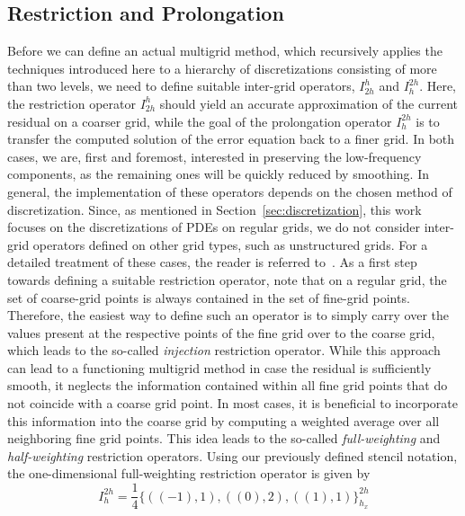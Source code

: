 \subsection{Restriction and Prolongation}
\label{subsec:restriction-and-prolongation}
Before we can define an actual multigrid method, which recursively applies the techniques introduced here to a hierarchy of discretizations consisting of more than two levels, we need to define suitable inter-grid operators, $I_{2h}^{h}$ and $I_{h}^{2h}$.
Here, the restriction operator $I_{2h}^{h}$ should yield an accurate approximation of the current residual on a coarser grid, while the goal of the prolongation operator $I_{h}^{2h}$ is to transfer the computed solution of the error equation back to a finer grid.
In both cases, we are, first and foremost, interested in preserving the low-frequency components, as the remaining ones will be quickly reduced by smoothing.
In general, the implementation of these operators depends on the chosen method of discretization. 
Since, as mentioned in Section~\ref{sec:discretization}, this work focuses on the discretizations of PDEs on regular grids, we do not consider inter-grid operators defined on other grid types, such as unstructured grids.
For a detailed treatment of these cases, the reader is referred to~\cite{trottenberg2000multigrid,ruge1987algebraic,stuben2001introduction}.
As a first step towards defining a suitable restriction operator, note that on a regular grid, the set of coarse-grid points is always contained in the set of fine-grid points.
Therefore, the easiest way to define such an operator is to simply carry over the values present at the respective points of the fine grid over to the coarse grid, which leads to the so-called \emph{injection} restriction operator.
While this approach can lead to a functioning multigrid method in case the residual is sufficiently smooth, it neglects the information contained within all fine grid points that do not coincide with a coarse grid point.
In most cases, it is beneficial to incorporate this information into the coarse grid by computing a weighted average over all neighboring fine grid points.
This idea leads to the so-called \emph{full-weighting} and \emph{half-weighting} restriction operators.
Using our previously defined stencil notation, the one-dimensional full-weighting restriction operator is given by
\begin{equation}
	I_{h}^{2 h} = \frac{1}{4}\{((-1), 1), ((0), 2), ((1), 1)\}_{h_x}^{2h}
\end{equation} 
